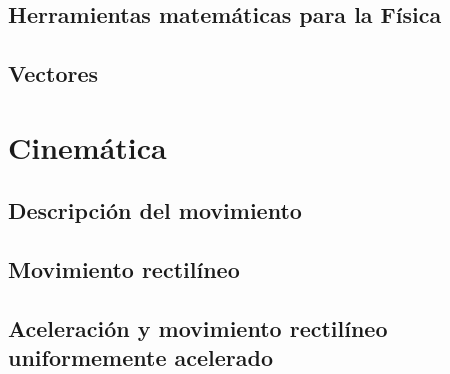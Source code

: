 ﻿\documentclass[11pt,letterpaper,openany]{book}
\newcommand{\rutaraiz}{../..}
\begin{document}
\chapter{Herramientas matemáticas para la Física}





\chapter{Vectores}





\part{Cinemática}



\chapter{Descripción del movimiento}





\chapter{Movimiento rectilíneo}





\chapter{Aceleración y movimiento rectilíneo uniformemente acelerado}
\end{document}
